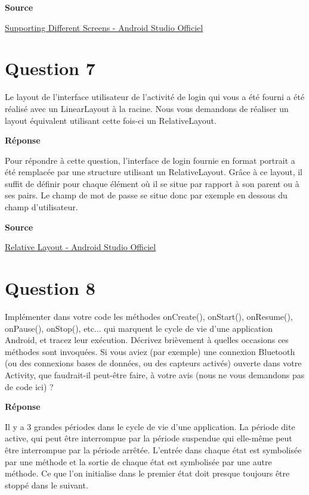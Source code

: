 \documentclass[francais,12pt]{article}
\begin{document}
		\textbf{Source}
        
        \href{https://developer.android.com/training/basics/supporting-devices/screens.html}{Supporting Different Screens - Android Studio Officiel}
		
	\section*{Question 7}
		Le layout de l'interface utilisateur de l'activité de login qui vous a été fourni a été réalisé avec un LinearLayout à la racine. Nous vous demandons de réaliser un layout équivalent utilisant cette fois-ci un RelativeLayout.  
		
		{\color[rgb]{0,0.5,0.23}\textbf{Réponse}}
        
		Pour répondre à cette question, l'interface de login fournie en format portrait a été remplacée par
une structure utilisant un RelativeLayout. Grâce à ce layout, il suffit de définir pour chaque élément où il se situe par rapport à son parent ou à ses pairs. Le champ de mot de passe se situe donc par exemple en dessous du champ d'utilisateur. 
		
		\textbf{Source}
        
        \href{https://developer.android.com/guide/topics/ui/layout/relative.html}{Relative Layout - Android Studio Officiel}
		
		\newpage
	\section*{Question 8}
		Implémenter dans votre code les méthodes onCreate(), onStart(), onResume(), onPause(), onStop(), etc... qui marquent le cycle de vie d'une application Android, et tracez leur exécution. Décrivez brièvement à quelles occasions ces méthodes sont invoquées. Si vous aviez (par exemple) une connexion Bluetooth (ou des connexions bases de données, ou des capteurs activés) ouverte dans votre Activity, que faudrait-il peut-être faire, à votre avis (nous ne vous demandons pas de code ici) ? 
		
		{\color[rgb]{0,0.5,0.23}\textbf{Réponse}}
        
		Il y a 3 grandes périodes dans le cycle de vie d'une application. La période dite active, qui peut être interrompue par la période suspendue qui elle-même peut être interrompue par la période arrêtée.
		L'entrée dans chaque état est symbolisée par une méthode et la sortie de chaque état est symbolisée par une autre méthode. Ce que l'on initialise dans le premier état doit presque toujours être stoppé dans le suivant.
		
\end{document}
